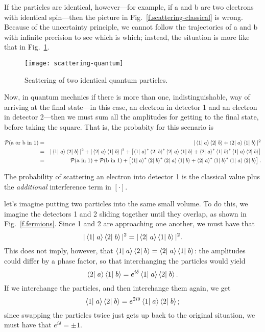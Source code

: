 If the particles are identical, however---for example, if a and b are two electrons with identical spin---then the picture in Fig.~\ref{f.scattering-classical} is wrong.  Because of the uncertainty principle, we cannot follow the trajectories of a and b with infinite precision to see which is which; instead, the situation is more like that in Fig.~\ref{f.scattering-quantum}.

\begin{figure}
    \texttt{[image: scattering-quantum]}
    \caption[Scattering of two identical quantum particles]{\label{f.scattering-quantum} Scattering of two identical quantum particles.}
\end{figure}

Now, in quantum mechnics if there is more than one, indistinguishable, way of arriving at the final state---in this case, an electron in detector 1 and an electron in detector 2---then we must sum all the amplitudes for getting to the final state, before taking the square. That is, the probabity for this scenario is
\begin{fullwidth}
\begin{eqnarray}
    \mathcal{P}(\textrm{a or b in 1}) &=& |\left\langle1\right|\left.a\right\rangle\left\langle2\right|\left.b\right\rangle + \left\langle2\right|\left.a\right\rangle\left\langle1\right|\left.b\right\rangle|^2\nonumber\\
    &=& |\left\langle1\right|\left.a\right\rangle\left\langle2\right|\left.b\right\rangle|^2 + |\left\langle2\right|\left.a\right\rangle\left\langle1\right|\left.b\right\rangle|^2 
    + \left[ \left\langle1\right|\left.a\right\rangle^*\left\langle2\right|\left.b\right\rangle^*\left\langle2\right|\left.a\right\rangle\left\langle1\right|\left.b\right\rangle + \left\langle2\right|\left.a\right\rangle^*\left\langle1\right|\left.b\right\rangle^*\left\langle1\right|\left.a\right\rangle\left\langle2\right|\left.b\right\rangle\right] \nonumber\\
    &=& \mathcal{P}(\textrm{a in 1}) + \mathcal{P}(\textrm{b in 1})
    + \left[ \left\langle1\right|\left.a\right\rangle^*\left\langle2\right|\left.b\right\rangle^*\left\langle2\right|\left.a\right\rangle\left\langle1\right|\left.b\right\rangle + \left\langle2\right|\left.a\right\rangle^*\left\langle1\right|\left.b\right\rangle^*\left\langle1\right|\left.a\right\rangle\left\langle2\right|\left.b\right\rangle\right].
    \label{e.scattering-quantum}
\end{eqnarray}
\end{fullwidth}
The probability of scattering an electron into detector 1 is the classical value plus the \emph{additional} interference term in $[\cdot]$.

 let's imagine putting two particles into the same small volume.  To do this, we imagine the detectors 1 and 2 sliding together until they overlap, as shown in Fig.~\ref{f.fermions}.  Since 1 and 2 are approaching one another, we must have that
\begin{equation}
    |\left\langle1\right|\left.a\right\rangle\left\langle2\right|\left.b\right\rangle|^2 = |\left\langle2\right|\left.a\right\rangle\left\langle1\right|\left.b\right\rangle|^2.
\end{equation}
This does not imply, however, that $\left\langle1\right|\left.a\right\rangle\left\langle2\right|\left.b\right\rangle = \left\langle2\right|\left.a\right\rangle\left\langle1\right|\left.b\right\rangle$: the amplitudes could differ by a phase factor, so that interchanging the particles would yield
\[
    \left\langle2\right|\left.a\right\rangle\left\langle1\right|\left.b\right\rangle = e^{i\delta}\left\langle1\right|\left.a\right\rangle\left\langle2\right|\left.b\right\rangle.
\]
If we interchange the particles, and then interchange them again, we get
\[
    \left\langle1\right|\left.a\right\rangle\left\langle2\right|\left.b\right\rangle = e^{2i\delta}\left\langle1\right|\left.a\right\rangle\left\langle2\right|\left.b\right\rangle;
\]
since swapping the particles twice just gets up back to the original situation, we must have that $e^{i\delta} = \pm 1$.

